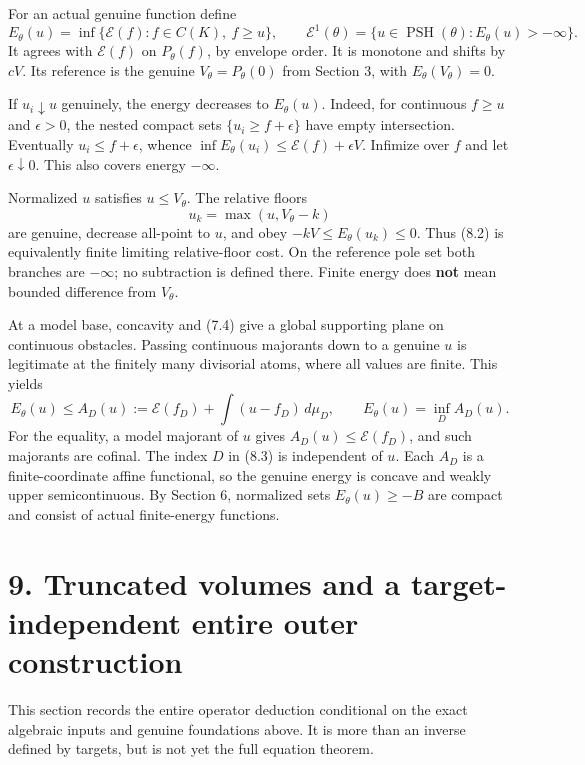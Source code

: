 \documentclass[
  10pt,
]{article}
\begin{document}
For an actual genuine function define
\[E_\theta(u)=\inf\{\mathscr E(f):f\in C(K),\ f\geq u\},
\qquad \mathcal E^1(\theta)=\{u\in\operatorname{PSH}(\theta):E_\theta(u)>-\infty\}.
\tag{8.2}\] It agrees with \(\mathscr E(f)\) on \(P_\theta(f)\), by
envelope order. It is monotone and shifts by \(cV\). Its reference is
the genuine \(V_\theta=P_\theta(0)\) from Section 3, with
\(E_\theta(V_\theta)=0\).

If \(u_i\downarrow u\) genuinely, the energy decreases to
\(E_\theta(u)\). Indeed, for continuous \(f\geq u\) and \(\epsilon>0\),
the nested compact sets \(\{u_i\geq f+\epsilon\}\) have empty
intersection. Eventually \(u_i\leq f+\epsilon\), whence
\(\inf E_\theta(u_i)\leq\mathscr E(f)+\epsilon V\). Infimize over \(f\)
and let \(\epsilon\downarrow0\). This also covers energy \(-\infty\).

Normalized \(u\) satisfies \(u\leq V_\theta\). The relative floors
\[u_k=\max(u,V_\theta-k)\] are genuine, decrease all-point to \(u\), and
obey \(-kV\leq E_\theta(u_k)\leq0\). Thus (8.2) is equivalently finite
limiting relative-floor cost. On the reference pole set both branches
are \(-\infty\); no subtraction is defined there. Finite energy does
\textbf{not} mean bounded difference from \(V_\theta\).

At a model base, concavity and (7.4) give a global supporting plane on
continuous obstacles. Passing continuous majorants down to a genuine
\(u\) is legitimate at the finitely many divisorial atoms, where all
values are finite. This yields \[E_\theta(u)\leq A_D(u):=
\mathscr E(f_D)+\int(u-f_D)\,d\mu_D,
\qquad E_\theta(u)=\inf_D A_D(u).\tag{8.3}\] For the equality, a model
majorant of \(u\) gives \(A_D(u)\leq\mathscr E(f_D)\), and such
majorants are cofinal. The index \(D\) in (8.3) is independent of \(u\).
Each \(A_D\) is a finite-coordinate affine functional, so the genuine
energy is concave and weakly upper semicontinuous. By Section 6,
normalized sets \(E_\theta(u)\geq-B\) are compact and consist of actual
finite-energy functions.

\section{9. Truncated volumes and a target-independent entire outer
construction}\label{truncated-volumes-and-a-target-independent-entire-outer-construction}

This section records the entire operator deduction conditional on the
exact algebraic inputs and genuine foundations above. It is more than an
inverse defined by targets, but is not yet the full equation theorem.
\end{document}
